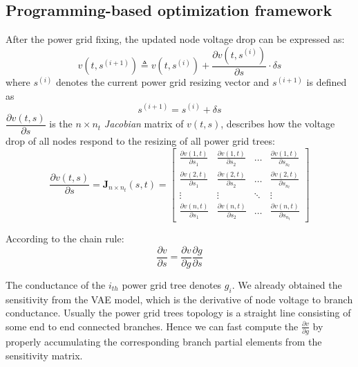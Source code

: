 \subsection{Programming-based optimization framework}
\label{subsec:lp}
After the power grid fixing, the updated node voltage drop can be
expressed as:
\begin{equation}
	\label{eq:v_taylor_expand}
	v(t, s^{(i+1)}) \triangleq v(t,s^{(i)}) + \dfrac{\partial v(t, s^{(i)})}{\partial s} \cdot \delta s
\end{equation}
where $s^{(i)}$ denotes the current power grid resizing vector and $s^{(i+1)}$
is defined as 
\begin{equation}
	\label{eq:s}
	s^{(i+1)} = s^{(i)} + \delta s 
\end{equation}
$ \dfrac{\partial v(t, s)}{\partial s}$ is the $n\times n_{t}$
\textit{Jacobian} matrix of $v(t,s)$, describes how the voltage drop
of all nodes respond to the resizing of all power grid trees:
\begin{equation}
\label{eq:J_matrix}
\dfrac{\partial v(t, s)}{\partial s}=
\mathbf {J}_{n\times n_{t}}(s,t) =
\begin{bmatrix}
\frac{\partial v(1,t)}{\partial s_{1}}&\frac{\partial v(1,t)}{\partial s_{2}}&\ldots&\frac{\partial v(1,t)}{\partial s_{n_{t}}}\\
\frac{\partial v(2,t)}{\partial s_{1}}&\frac{\partial v(2,t)}{\partial s_{2}}&\ldots&\frac{\partial v(2,t)}{\partial s_{n_{t}}}\\
\vdots&\vdots&\ddots&\vdots\\
\frac{\partial v(n,t)}{\partial s_{1}}&\frac{\partial v(n,t)}{\partial s_{2}}&\ldots&\frac{\partial v(n,t)}{\partial s_{n_{t}}}
\end{bmatrix}
\end{equation}

According to the chain rule:
\label{eq:chain_rule}
\begin{equation}
\frac{\partial v}{\partial s}=\frac{\partial v}{\partial g} \frac{\partial g}{\partial s}
\end{equation}

The conductance of the $i_{th}$ power grid tree denotes $g_{i}$. We
already obtained the sensitivity from the VAE model, which is the derivative
of node voltage to branch conductance. Usually the power grid trees topology
is a straight line consisting of some end to end connected
branches. Hence we can fast compute the
$\frac{\partial v}{\partial g}$ by properly accumulating the corresponding
branch partial elements from the sensitivity matrix.

